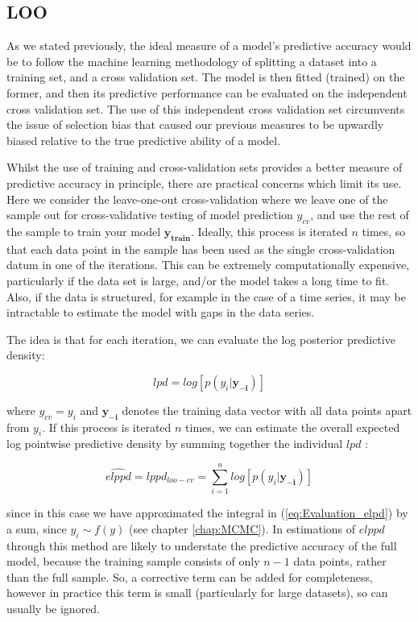 \documentclass[11pt,fullpage]{book}
\begin{document}
\subsection{LOO}
As we stated previously, the ideal measure of a model's predictive accuracy would be to follow the machine learning methodology of splitting a dataset into a training set, and a cross validation set. The model is then fitted (trained) on the former, and then its predictive performance can be evaluated on the independent cross validation set. The use of this independent cross validation set circumvents the issue of selection bias that caused our previous measures to be upwardly biased relative to the true predictive ability of a model. 

Whilst the use of training and cross-validation sets provides a better measure of predictive accuracy in principle, there are practical concerns which limit its use. Here we consider the leave-one-out cross-validation where we leave one of the sample out for cross-validative testing of model prediction $y_{cv}$, and use the rest of the sample to train your model $\boldsymbol{y_{train}}$. Ideally, this process is iterated $n$ times, so that each data point in the sample has been used as the single cross-validation datum in one of the iterations. This can be extremely computationally expensive, particularly if the data set is large, and/or the model takes a long time to fit. Also, if the data is structured, for example in the case of a time series, it may be intractable to estimate the model with gaps in the data series. 

The idea is that for each iteration, we can evaluate the log posterior predictive density:

\begin{equation}
lpd = log\left[p(y_i|\boldsymbol{y_{-i}})\right]
\end{equation}

where $y_{cv}=y_i$ and $\boldsymbol{y_{-i}}$ denotes the training data vector with all data points apart from $y_i$. If this process is iterated $n$ times, we can estimate the overall expected log pointwise predictive density by summing together the individual $lpd$ \cite{gelman2013bayesian}:

\begin{equation}
\widehat{elppd} = lppd_{loo-cv} = \sum\limits_{i=1}^{n}log\left[p(y_i|\boldsymbol{y_{-i}})\right]
\end{equation}

since in this case we have approximated the integral in (\ref{eq:Evaluation_elpd}) by a sum, since $y_i\sim f(y)$ (see chapter \ref{chap:MCMC}). In estimations of $elppd$ through this method are likely to understate the predictive accuracy of the full model, because the training sample consists of only $n-1$ data points, rather than the full sample\cite{gelman2013bayesian}. So, a corrective term can be added for completeness, however in practice this term is small (particularly for large datasets), so can usually be ignored.
\end{document}
